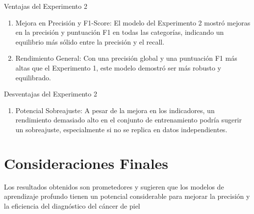Ventajas del Experimento 2
\begin{enumerate}
    \item Mejora en Precisión y F1-Score: El modelo del Experimento 2 mostró mejoras en la precisión y puntuación F1 en todas las categorías, indicando un equilibrio más sólido entre la precisión y el recall.
    \item Rendimiento General: Con una precisión global y una puntuación F1 más altas que el Experimento 1, este modelo demostró ser más robusto y equilibrado.
\end{enumerate}

Desventajas del Experimento 2
\begin{enumerate}
    \item Potencial Sobreajuste: A pesar de la mejora en los indicadores, un rendimiento demasiado alto en el conjunto de entrenamiento podría sugerir un sobreajuste, especialmente si no se replica en datos independientes.
\end{enumerate}

\section{Consideraciones Finales}\label{subsubsec:final_considerations}

Los resultados obtenidos son prometedores y sugieren que los modelos de aprendizaje profundo tienen un potencial considerable para mejorar la precisión y la eficiencia del diagnóstico del cáncer de piel
